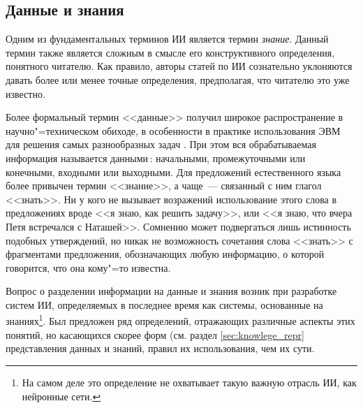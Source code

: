 \documentclass[a4paper,14pt, openany, twoside, draft]{extbook} %
\begin{document}
\subsection{Данные и знания}

Одним из фундаментальных терминов ИИ является термин {\em знание}. Данный термин также является сложным в смысле его конструктивного определения, понятного читателю. Как правило, авторы статей по ИИ сознательно уклоняются давать более или менее точные определения, предполагая, что читателю это уже известно.

Более формальный термин <<данные>> получил широкое распространение в научно"=техническом обиходе, в особенности в практике использования ЭВМ для решения самых разнообразных задач \cite{AIDictionary}. При этом вся обрабатываемая информация называется данными\,: начальными, промежуточными или конечными, входными или выходными. Для предложений естественного языка более привычен термин <<знание>>, а чаще~--- связанный с ним глагол <<знать>>. Ни у кого не вызывает возражений использование этого слова в предложениях вроде <<я знаю, как решить задачу>>, или <<я знаю, что вчера Петя встречался с Наташей>>. Сомнению может подвергаться лишь истинность подобных утверждений, но никак не возможность сочетания слова <<знать>> с фрагментами предложения, обозначающих любую информацию, о которой говорится, что она кому"=то известна.

Вопрос о разделении информации на данные и знания возник при разработке систем ИИ, определяемых в последнее время как системы, основанные на знаниях\footnote{На самом деле это определение не охватывает такую важную отрасль ИИ, как нейронные сети.}. Был предложен ряд определений, отражающих различные аспекты этих понятий, но касающихся скорее форм (см. раздел \ref{sec:knowlege_repr} представления данных и знаний, правил их использования, чем их сути.
\end{document}
